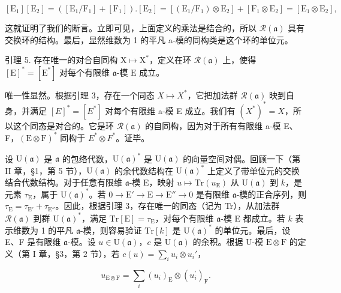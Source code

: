 \[
[ \mathrm{E} _ {1} ] [ \mathrm{E} _ {2} ] = ([ \mathrm{E} _ {1} / \mathrm{F} _ {1} ] + [ \mathrm{F} _ {1} ]). [ \mathrm{E} _ {2} ] = [ (\mathrm{E} _ {1} / \mathrm{F} _ {1}) \otimes \mathrm{E} _ {2} ] + [ \mathrm{F} _ {1} \otimes \mathrm{E} _ {2} ] = [ \mathrm{E} _ {1} \otimes \mathrm{E} _ {2} ],
\]

这就证明了我们的断言。立即可见，上面定义的乘法是结合的，所以 \(\mathcal{R}(\mathfrak{a})\) 具有交换环的结构。最后，显然维数为 1 的平凡 a-模的同构类是这个环的单位元。

引理 5. 存在唯一的对合自同构 \(\mathrm{X} \mapsto \mathrm{X}^*\)，定义在环 \(\mathcal{R}(\mathfrak{a})\) 上，使得 \([\mathrm{E}]^* = [\mathrm{E}^*]\) 对每个有限维 \(\mathfrak{a}\)-模 \(\mathrm{E}\) 成立。

唯一性显然。根据引理 3，存在一个同态 \(X \mapsto X^{*}\)，它把加法群 \(\mathcal{R}(\mathfrak{a})\) 映到自身，并满足 \([E]^{*} = [E^{*}]\) 对每个有限维 a-模 E 成立。我们有 \((X^{*})^{*} = X\)，所以这个同态是对合的。它是环 \(\mathcal{R}(\mathfrak{a})\) 的自同构，因为对于所有有限维 a-模 E、F，\((\mathrm{E} \otimes \mathrm{F})^{*}\) 同构于 \(E^{*} \otimes F^{*}\)。证毕。

设 \(\mathrm{U}(\mathfrak{a})\) 是 \(\mathfrak{a}\) 的包络代数，\(\mathrm{U}(\mathfrak{a})^*\) 是 \(\mathrm{U}(\mathfrak{a})\) 的向量空间对偶。回顾一下（第 II 章，§1，第 5 节），\(\mathrm{U}(\mathfrak{a})\) 的余代数结构在 \(\mathrm{U}(\mathfrak{a})^*\) 上定义了带单位元的交换结合代数结构。对于任意有限维 \(\mathfrak{a}\)-模 E，映射 \(u \mapsto \mathrm{Tr}(u_{\mathrm{E}})\) 从 \(\mathrm{U}(\mathfrak{a})\) 到 \(k\)，是元素 \(\tau_{\mathrm{E}}\)，属于 \(\mathrm{U}(\mathfrak{a})^*\)。若 \(0 \longrightarrow \mathrm{E}' \longrightarrow \mathrm{E} \longrightarrow \mathrm{E}'' \longrightarrow 0\) 是有限维 \(\mathfrak{a}\)-模的正合序列，则 \(\tau_{\mathrm{E}} = \tau_{\mathrm{E}'} + \tau_{\mathrm{E}''}\)。因此，根据引理 3，存在唯一的同态（记为 Tr），从加法群 \(\mathcal{R}(\mathfrak{a})\) 到群 \(\mathrm{U}(\mathfrak{a})^*\)，满足 \(\mathrm{Tr}[\mathrm{E}] = \tau_{\mathrm{E}}\)，对每个有限维 \(\mathfrak{a}\)-模 E 都成立。若 \(k\) 表示维数为 1 的平凡 \(\mathfrak{a}\)-模，则容易验证 \(\mathrm{Tr}[k]\) 是 \(\mathrm{U}(\mathfrak{a})^*\) 的单位元。最后，设 E、F 是有限维 \(\mathfrak{a}\)-模。设 \(u \in \mathrm{U}(\mathfrak{a})\)，\(c\) 是 \(\mathrm{U}(\mathfrak{a})\) 的余积。根据 U-模 \(\mathrm{E} \otimes \mathrm{F}\) 的定义（第 I 章，§3，第 2 节），若 \(c(u) = \sum_{i} u_i \otimes u_i'\)，

\[
u _ {\mathrm{E} \otimes \mathrm{F}} = \sum_ {i} (u _ {i}) _ {\mathrm{E}} \otimes (u _ {i} ^ {\prime}) _ {\mathrm{F}}.
\]

